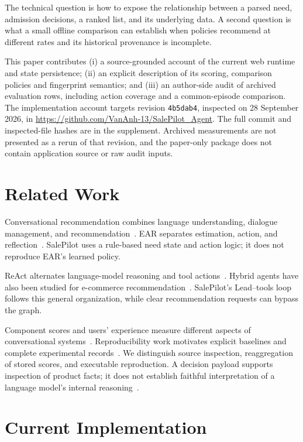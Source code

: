\documentclass[conference,a4paper]{IEEEtran}
\newcommand{\code}[1]{\texttt{#1}}
\begin{document}
The technical question is how to expose the relationship between a parsed need, admission decisions, a ranked list, and its underlying data. A second question is what a small offline comparison can establish when policies recommend at different rates and its historical provenance is incomplete.

This paper contributes (i) a source-grounded account of the current web runtime and state persistence; (ii) an explicit description of its scoring, comparison policies and fingerprint semantics; and (iii) an author-side audit of archived evaluation rows, including action coverage and a common-episode comparison. The implementation account targets revision \code{4b5dab4}, inspected on 28 September 2026, in \url{https://github.com/VanAnh-13/SalePilot_Agent}. The full commit and inspected-file hashes are in the supplement. Archived measurements are not presented as a rerun of that revision, and the paper-only package does not contain application source or raw audit inputs.

\section{Related Work}
Conversational recommendation combines language understanding, dialogue management, and recommendation~\cite{jannach2021survey}. EAR separates estimation, action, and reflection~\cite{lei2020ear}. SalePilot uses a rule-based need state and action logic; it does not reproduce EAR's learned policy.

ReAct alternates language-model reasoning and tool actions~\cite{yao2023react}. Hybrid agents have also been studied for e-commerce recommendation~\cite{nie2024hybrid}. SalePilot's Lead--tools loop follows this general organization, while clear recommendation requests can bypass the graph.

Component scores and users' experience measure different aspects of conversational systems~\cite{jannach2023evaluating}. Reproducibility work motivates explicit baselines and complete experimental records~\cite{ferraridacrema2021troubling,pineau2021reproducibility}. We distinguish source inspection, reaggregation of stored scores, and executable reproduction. A decision payload supports inspection of product facts; it does not establish faithful interpretation of a language model's internal reasoning~\cite{jacovi2020faithfulness}.

\section{Current Implementation}
\end{document}
